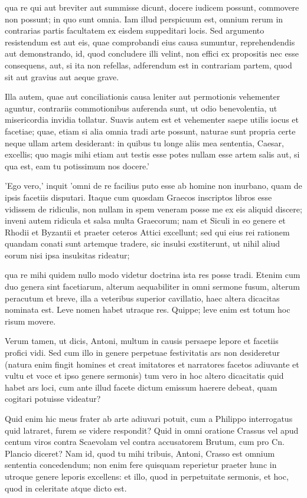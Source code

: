  qua re qui aut breviter aut summisse dicunt, docere iudicem possunt, commovere non possunt; in quo sunt omnia. Iam illud perspicuum est, omnium rerum in contrarias partis facultatem ex eisdem suppeditari locis. Sed argumento resistendum est aut eis, quae comprobandi eius causa sumuntur, reprehendendis aut demonstrando, id, quod concludere illi velint, non effici ex propositis nec esse consequens, aut, si ita non refellas, adferendum est in contrariam partem, quod sit aut gravius aut aeque grave.

 Illa autem, quae aut conciliationis causa leniter aut permotionis vehementer aguntur, contrariis commotionibus auferenda sunt, ut odio benevolentia, ut misericordia invidia tollatur. Suavis autem est et vehementer saepe utilis iocus et facetiae; quae, etiam si alia omnia tradi arte possunt, naturae sunt propria certe neque ullam artem desiderant: in quibus tu longe aliis mea sententia, Caesar, excellis; quo magis mihi etiam aut testis esse potes nullam esse artem salis aut, si qua est, eam tu potissimum nos docere.'

 'Ego vero,' inquit 'omni de re facilius puto esse ab homine non inurbano, quam de ipsis facetiis disputari. Itaque cum quosdam Graecos inscriptos libros esse vidissem de ridiculis, non nullam in spem veneram posse me ex eis aliquid discere; inveni autem ridicula et salsa multa Graecorum; nam et Siculi in eo genere et Rhodii et Byzantii et praeter ceteros Attici excellunt; sed qui eius rei rationem quandam conati sunt artemque tradere, sic insulsi exstiterunt, ut nihil aliud eorum nisi ipsa insulsitas rideatur;

 qua re mihi quidem nullo modo videtur doctrina ista res posse tradi. Etenim cum duo genera sint facetiarum, alterum aequabiliter in omni sermone fusum, alterum peracutum et breve, illa a veteribus superior cavillatio, haec altera dicacitas nominata est. Leve nomen habet utraque res. Quippe; leve enim est totum hoc risum movere.

 Verum tamen, ut dicis, Antoni, multum in causis persaepe lepore et facetiis profici vidi. Sed cum illo in genere perpetuae festivitatis ars non desideretur (natura enim fingit homines et creat imitatores et narratores facetos adiuvante et vultu et voce et ipso genere sermonis) tum vero in hoc altero dicacitatis quid habet ars loci, cum ante illud facete dictum emissum haerere debeat, quam cogitari potuisse videatur?

 Quid enim hic meus frater ab arte adiuvari potuit, cum a Philippo interrogatus quid latraret, furem se videre respondit? Quid in omni oratione Crassus vel apud centum viros contra Scaevolam vel contra accusatorem Brutum, cum pro Cn. Plancio diceret? Nam id, quod tu mihi tribuis, Antoni, Crasso est omnium sententia concedendum; non enim fere quisquam reperietur praeter hunc in utroque genere leporis excellens: et illo, quod in perpetuitate sermonis, et hoc, quod in celeritate atque dicto est.

